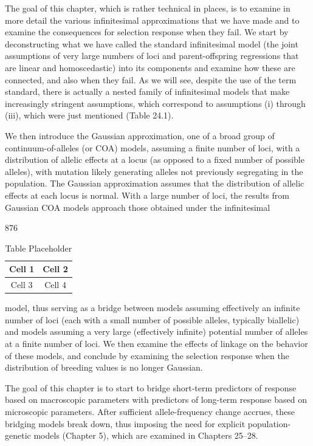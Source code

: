 \documentclass{article}
\begin{document}
The goal of this chapter, which is rather technical in places, is to examine in more detail the various infinitesimal approximations that we have made and to examine the consequences for selection response when they fail. We start by deconstructing what we have called the standard infinitesimal model (the joint assumptions of very large numbers of loci and parent-offspring regressions that are linear and homoscedastic) into its components and examine how these are connected, and also when they fail. As we will see, despite the use of the term standard, there is actually a nested family of infinitesimal models that make increasingly stringent assumptions, which correspond to assumptions (i) through (iii), which were just mentioned (Table 24.1).

We then introduce the Gaussian approximation, one of a broad group of continuum-of-alleles (or COA) models, assuming a finite number of loci, with a distribution of allelic effects at a locus (as opposed to a fixed number of possible alleles), with mutation likely generating alleles not previously segregating in the population. The Gaussian approximation assumes that the distribution of allelic effects at each locus is normal. With a large number of loci, the results from Gaussian COA models approach those obtained under the infinitesimal

876

\begin{table}[h]
\centering
\begin{tabular}{|c|c|}
\hline
Cell 1 & Cell 2 \\
\hline
Cell 3 & Cell 4 \\
\hline
\end{tabular}
\caption{Table Placeholder}
\end{table}

model, thus serving as a bridge between models assuming effectively an infinite number of loci (each with a small number of possible alleles, typically biallelic) and models assuming a very large (effectively infinite) potential number of alleles at a finite number of loci. We then examine the effects of linkage on the behavior of these models, and conclude by examining the selection response when the distribution of breeding values is no longer Gaussian.

The goal of this chapter is to start to bridge short-term predictors of response based on macroscopic parameters with predictors of long-term response based on microscopic parameters. After sufficient allele-frequency change accrues, these bridging models break down, thus imposing the need for explicit population-genetic models (Chapter 5), which are examined in Chapters 25–28.
\end{document}
